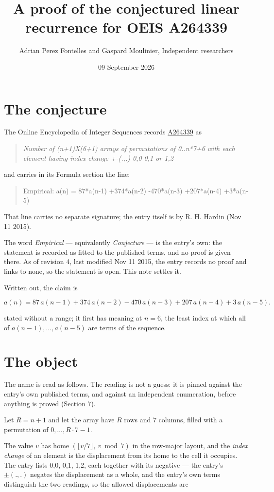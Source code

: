 \documentclass[11pt]{article}
\title{A proof of the conjectured linear recurrence for OEIS A264339}
\author{Adrian Perez Fontelles and Gaspard Moulinier, Independent researchers}
\date{09 September 2026}
\theoremstyle{definition}
\begin{document}
\maketitle
\section{The conjecture}

The Online Encyclopedia of Integer Sequences records \href{https://oeis.org/A264339}{A264339} as

\begin{quote}\itshape Number of (n+1)X(6+1) arrays of permutations of 0..n*7+6 with each element having index change +-(.,.) 0,0 0,1 or 1,2\end{quote}

and carries in its Formula section the line:

\begin{quote}\ttfamily Empirical: a(n) = 87*a(n-1) +374*a(n-2) -470*a(n-3) +207*a(n-4) +3*a(n-5)\end{quote}

That line carries no separate signature; the entry itself is by R. H. Hardin (Nov 11 2015).

The word {\itshape Empirical} --- equivalently {\itshape Conjecture} --- is the entry's own: the statement is recorded as fitted to the published terms, and no proof is given there. As of revision 4, last modified Nov 11 2015, the entry records no proof and links to none, so the statement is open. This note settles it.

Written out, the claim is

\[a(n) = 87\,a(n-1) + 374\,a(n-2) - 470\,a(n-3) + 207\,a(n-4) + 3\,a(n-5).\]

stated without a range; it first has meaning at $n = 6$, the least index at which all of $a(n-1),\dots,a(n-5)$ are terms of the sequence.

\section{The object}

The name is read as follows. The reading is not a guess: it is pinned against the entry's own published terms, and against an independent enumeration, before anything is proved (Section 7).

Let $R = n + 1$ and let the array have $R$ rows and $7$ columns, filled with a permutation of $0,\dots,R\cdot7-1$.

The value $v$ has home $(\lfloor v/7\rfloor,\ v \bmod 7)$ in the row-major layout, and the {\itshape index change} of an element is the displacement from its home to the cell it occupies. The entry lists 0,0, 0,1, 1,2, each together with its negative --- the entry's $\pm(.,.)$ negates the displacement as a whole, and the entry's own terms distinguish the two readings, so the allowed displacements are
\end{document}
